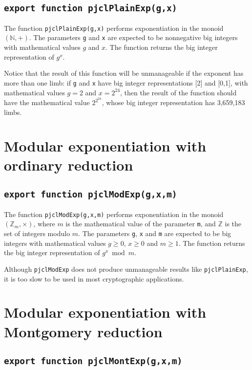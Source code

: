 \documentclass[12pt]{article}
\begin{document}
\subsection{\tt export function pjclPlainExp(g,x)}

The function {\tt pjclPlainExp(g,x)} performs exponentiation in the
monoid $(\mathbb{N},+)$.  The parameters {\tt g} and {\tt x} are
expected to be nonnegative big integers with mathematical values $g$
and $x$.  The function returns the big integer representation of
$g^x$.

Notice that the result of this function will be unmanageable if the
exponent has more than one limb: if {\tt g} and {\tt x} have big
integer representations [2] and [0,1], with mathematical values $g =
2$ and $x = 2^{24}$, then the result of the function should have the mathematical
value $2^{2^{24}}$, whose big integer representation has 3,659,183
limbs.

\section{Modular exponentiation with ordinary reduction}

\subsection{\tt export function pjclModExp(g,x,m)}

The function {\tt pjclModExp(g,x,m)} performs exponentiation in the
monoid $(\mathbb{Z}_m,\times)$, where $m$ is the mathematical value of
the parameter {\tt m}, and $\mathbb{Z}$ is the set of integers modulo
$m$.  The parameters {\tt g}, {\tt x} and {\tt m} are expected to be
big integers with mathematical values $g \geq 0$, $x \geq 0$ and $m \geq 1$.
The function returns the big integer representation of $g^x \bmod m$.

Although {\tt pjclModExp} does not produce unmanageable results like
{\tt pjclPlainExp}, it is too slow to be used in most cryptographic
applications.

\section{Modular exponentiation with Montgomery reduction}

\subsection{\tt export function pjclMontExp(g,x,m)}
\end{document}
